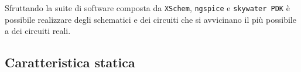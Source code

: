 	
	Sfruttando la suite di software composta da \texttt{XSchem}, \texttt{ngspice} e \texttt{skywater PDK} è possibile realizzare degli schematici e dei circuiti che si avvicinano il più possibile a dei circuiti reali.
	
	\subsection*{Caratteristica statica}
	
	
	
	
	
	
	
	
	
	
	
	
	
	
	
	
	
	
	
	
	
	
	
	
	
	
	